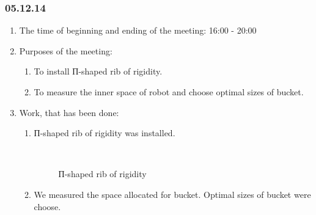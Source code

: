 \subsubsection{05.12.14}

\begin{enumerate}
	\item The time of beginning and ending of the meeting:
	16:00 - 20:00
	\item Purposes of the meeting:
	\begin{enumerate}
	  \item To install П-shaped rib of rigidity.
	  
	  \item To measure the inner space of robot and choose optimal sizes of bucket.
	  
    \end{enumerate}
	\item Work, that has been done:
	\begin{enumerate}
	  \item П-shaped rib of rigidity was installed.
	  
	  \begin{figure}[H]
	  	\begin{minipage}[h]{0.2\linewidth}
	  		\center  
	  	\end{minipage}
	  	\begin{minipage}[h]{0.6\linewidth}
	  		\caption{П-shaped rib of rigidity}
	  	\end{minipage}
	  \end{figure}
	  
	  \item We measured the space allocated for bucket. Optimal sizes of bucket were choose.
	  

\end{enumerate}
\end{enumerate}
